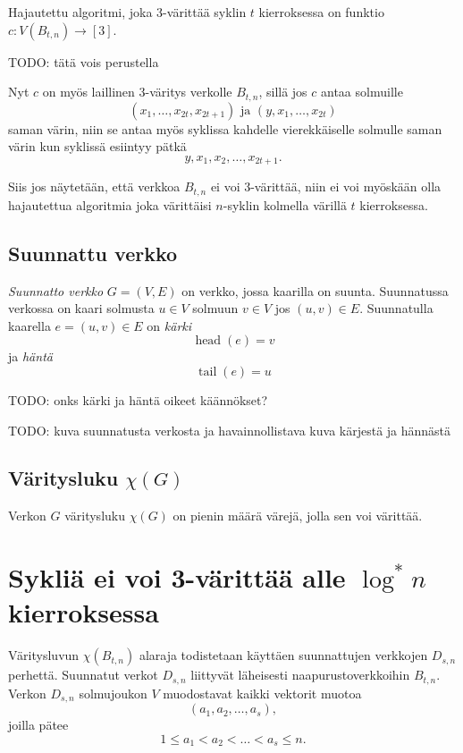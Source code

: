 \documentclass[finnish]{tktltiki2}
\theoremstyle{definition}
\theoremstyle{remark}
\DeclareMathOperator{\head}{head}
\DeclareMathOperator{\tail}{tail}
\newcommand{\Dsn}{D_{s,n}}
\begin{document}
Hajautettu algoritmi, joka 3-värittää syklin
$t$ kierroksessa on funktio $c : V(B_{t,n}) \to [3]$.

TODO: tätä vois perustella

Nyt $c$ on myös laillinen 3-väritys verkolle $B_{t,n}$, sillä jos $c$ antaa
solmuille
%
\begin{equation*}
    (x_1, \dots, x_{2t}, x_{2t+1}) \text{ ja } (y,x_1,\dots,x_{2t})
\end{equation*}
%
saman värin, niin se antaa myös syklissa kahdelle vierekkäiselle solmulle saman
värin kun syklissä esiintyy pätkä
%
\begin{equation*}
    y, x_1, x_2, \dots, x_{2t+1}.
\end{equation*}

Siis jos näytetään, että verkkoa $B_{t,n}$ ei voi 3-värittää, niin ei voi
myöskään olla hajautettua algoritmia joka värittäisi $n$-syklin kolmella
värillä $t$ kierroksessa.

\subsection{Suunnattu verkko}

\emph{Suunnatto verkko} $G = (V,E)$ on verkko, jossa kaarilla on suunta.
Suunnatussa verkossa on kaari solmusta $u \in V$ solmuun $v \in V$ jos $(u,v)
\in E$. Suunnatulla kaarella $e = (u,v) \in E$ on \emph{kärki}
%
\begin{equation*}
    \head(e) = v
\end{equation*}
%
ja \emph{häntä}
%
\begin{equation*}
    \tail(e) = u
\end{equation*}

TODO: onks kärki ja häntä oikeet käännökset?

TODO: kuva suunnatusta verkosta ja havainnollistava kuva kärjestä ja hännästä

\subsection{Väritysluku $\chi(G)$}

Verkon $G$ väritysluku $\chi(G)$ on pienin määrä värejä, jolla sen voi värittää.

\section{Sykliä ei voi 3-värittää alle $\log^* n$ kierroksessa}

Väritysluvun $\chi(B_{t,n})$ alaraja todistetaan käyttäen suunnattujen
verkkojen $\Dsn$ perhettä. Suunnatut verkot $\Dsn$ liittyvät läheisesti
naapurustoverkkoihin $B_{t,n}$. Verkon $\Dsn$ solmujoukon $V$ muodostavat
kaikki vektorit muotoa
%
\begin{equation*}
    (a_1,a_2,\dots,a_s),
\end{equation*}
%
joilla pätee
%
\begin{equation*}
    1 \leq a_1 < a_2 < \dots < a_s \leq n.
\end{equation*}
\end{document}
